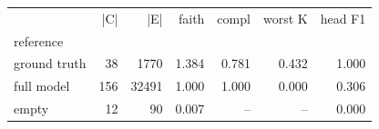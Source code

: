\begin{tabular}{lrrrrrr}
\toprule
 & |C| & |E| & faith & compl & worst K & head F1 \\
reference &  &  &  &  &  &  \\
\midrule
ground truth & 38 & 1770 & 1.384 & 0.781 & 0.432 & 1.000 \\
full model & 156 & 32491 & 1.000 & 1.000 & 0.000 & 0.306 \\
empty & 12 & 90 & 0.007 & -- & -- & 0.000 \\
\bottomrule
\end{tabular}
